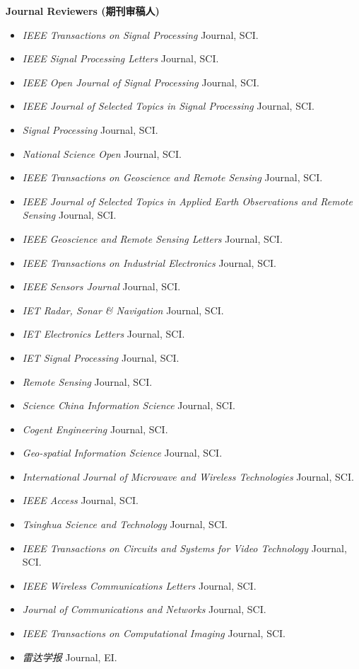\documentclass[paper=a4,fontsize=11pt]{scrartcl}
\begin{document}
\textbf{Journal Reviewers (期刊审稿人)} 
\begin{itemize}
	\item \textit{IEEE Transactions on Signal Processing} Journal, SCI.
	\item \textit{IEEE Signal Processing Letters} Journal, SCI.
	\item \textit{IEEE Open Journal of Signal Processing} Journal, SCI.
	\item \textit{IEEE Journal of Selected Topics in Signal Processing} Journal, SCI.
	\item \textit{Signal Processing} Journal, SCI.
	\item \textit{National Science Open} Journal, SCI.
	\item \textit{IEEE Transactions on Geoscience and Remote Sensing} Journal, SCI.
	\item \textit{IEEE Journal of Selected Topics in Applied Earth Observations and Remote Sensing} Journal, SCI.
	\item \textit{IEEE Geoscience and Remote Sensing Letters} Journal, SCI.
	\item \textit{IEEE Transactions on Industrial Electronics} Journal, SCI.
	\item \textit{IEEE Sensors Journal} Journal, SCI.
	\item \textit{IET Radar, Sonar \& Navigation} Journal, SCI.
	\item \textit{IET Electronics Letters} Journal, SCI.
	\item \textit{IET Signal Processing} Journal, SCI.
	\item \textit{Remote Sensing} Journal, SCI.
	\item \textit{Science China Information Science} Journal, SCI.
	\item \textit{Cogent Engineering} Journal, SCI.
	\item \textit{Geo-spatial Information Science} Journal, SCI.
	\item \textit{International Journal of Microwave and Wireless Technologies} Journal, SCI.
	\item \textit{IEEE Access} Journal, SCI.
	\item \textit{Tsinghua Science and Technology} Journal, SCI.
	\item \textit{IEEE Transactions on Circuits and Systems for Video Technology} Journal, SCI.
	\item \textit{IEEE Wireless Communications Letters } Journal, SCI.
	\item \textit{Journal of Communications and Networks} Journal, SCI.
	\item \textit{IEEE Transactions on Computational Imaging} Journal, SCI.
	\item \textit{雷达学报} Journal, EI.
\end{itemize}
\end{document}
